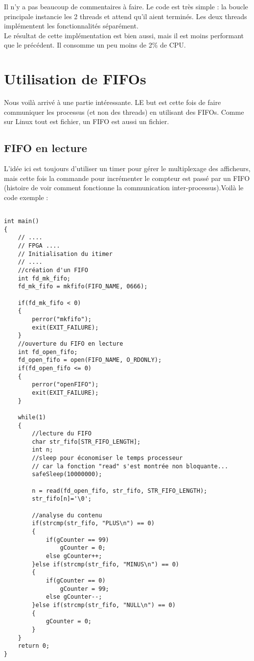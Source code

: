 \pagebreak Il n'y a pas beaucoup de commentaires à faire. Le code est très simple : la boucle principale instancie les 2 threads et attend  qu'il aient terminés. Les deux threads implémentent les fonctionnalités séparément.\\


Le résultat de cette implémentation est bien aussi, mais il est moins performant que le précédent. Il consomme un peu moins de 2\% de CPU.

 
\newpage\section{Utilisation de FIFOs}
Nous voilà arrivé à une partie intéressante. LE but est cette fois de faire communiquer les processus (et non des threads) en utilisant des FIFOs. Comme sur Linux tout est fichier, un FIFO est aussi un fichier.\\
\subsection{FIFO en lecture}
L'idée ici est toujours d'utiliser un timer pour gérer le multiplexage des afficheurs, mais cette fois la commande pour incrémenter le compteur est passé par un FIFO (histoire de voir comment fonctionne la communication inter-processus).Voilà le code exemple :
\begin{lstlisting}[frame=single,style=C]  % Start your code-block

int main()
{
	// ....
	// FPGA ....
	// Initialisation du itimer
	// ....
	//création d'un FIFO
	int fd_mk_fifo;
	fd_mk_fifo = mkfifo(FIFO_NAME, 0666);

	if(fd_mk_fifo < 0)
	{
		perror("mkfifo");
		exit(EXIT_FAILURE);
	}
	//ouverture du FIFO en lecture
	int fd_open_fifo;
	fd_open_fifo = open(FIFO_NAME, O_RDONLY);
	if(fd_open_fifo <= 0)
	{
		perror("openFIFO");
		exit(EXIT_FAILURE);
	}

	while(1)
	{
		//lecture du FIFO
		char str_fifo[STR_FIFO_LENGTH];
		int n;
		//sleep pour économiser le temps processeur
		// car la fonction "read" s'est montrée non bloquante...
		safeSleep(10000000);

		n = read(fd_open_fifo, str_fifo, STR_FIFO_LENGTH);
		str_fifo[n]='\0';

		//analyse du contenu
		if(strcmp(str_fifo, "PLUS\n") == 0)
		{
			if(gCounter == 99)
				gCounter = 0;
			else gCounter++;
		}else if(strcmp(str_fifo, "MINUS\n") == 0)
		{
			if(gCounter == 0)
				gCounter = 99;
			else gCounter--;
		}else if(strcmp(str_fifo, "NULL\n") == 0)
		{
			gCounter = 0;
		}
	}
	return 0;
}
\end{lstlisting}

